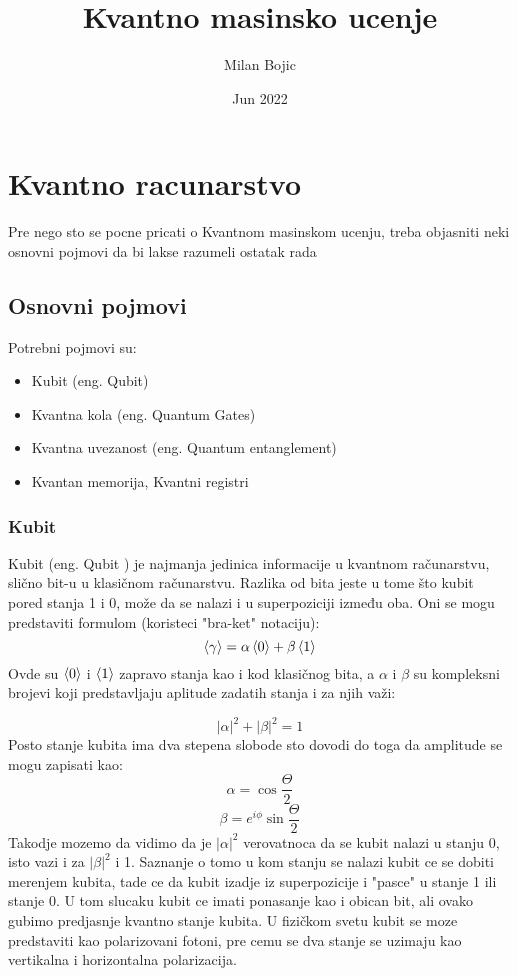 \documentclass[12pt, letterpaper, oneside]{article}
\title{Kvantno masinsko ucenje}
\author{Milan Bojic}
\date{Jun 2022}
\begin{document}
\maketitle
\newpage

\tableofcontents
\newpage
\section{Kvantno racunarstvo}
Pre nego sto se pocne pricati o Kvantnom masinskom ucenju, treba objasniti neki osnovni pojmovi da bi lakse razumeli ostatak rada

\subsection{Osnovni pojmovi}
Potrebni pojmovi su:
\begin{itemize}
    \item Kubit (eng. Qubit)
    \item Kvantna kola (eng. Quantum Gates)
    \item Kvantna uvezanost (eng. Quantum entanglement)
    \item Kvantan memorija, Kvantni registri
\end{itemize}

\subsubsection*{Kubit}
Kubit (eng. Qubit ) je najmanja jedinica informacije u kvantnom računarstvu, slično bit-u u klasičnom računarstvu.
Razlika od bita jeste u tome što kubit pored stanja 1 i 0, može da se nalazi i u superpoziciji između oba.
Oni se mogu predstaviti formulom (koristeci "bra-ket" notaciju):
\[ \braket{\gamma} =  \alpha\braket{0}+\beta\braket{1} \]
Ovde su $\braket{0}$ i $\braket{1}$ zapravo stanja kao i kod klasičnog bita, a $\alpha$ i $\beta$ su kompleksni brojevi koji predstavljaju aplitude zadatih stanja i za njih važi:

\[ |\alpha|^2+|\beta|^2 = 1 \]
Posto stanje kubita ima dva stepena slobode sto dovodi do toga da amplitude se mogu zapisati kao:
\[
    \alpha = \cos{\frac{\Theta}{2}} 
\]
\[
    \beta = e^{i\phi}\sin{\frac{\Theta}{2}}
\]
Takodje mozemo da vidimo da je $|\alpha|^2$ verovatnoca da se kubit nalazi u stanju 0, isto vazi i za $ |\beta|^2$ i 1.
Saznanje o tomo u kom stanju se nalazi kubit ce se dobiti merenjem kubita, tade ce da kubit izadje iz superpozicije i "pasce" u stanje 1 ili stanje 0. U tom slucaku kubit ce imati ponasanje kao i obican bit, ali ovako gubimo predjasnje kvantno stanje kubita.
U fizičkom svetu kubit se moze predstaviti kao polarizovani fotoni, pre cemu se dva stanje se uzimaju kao vertikalna i horizontalna polarizacija.
\end{document}
